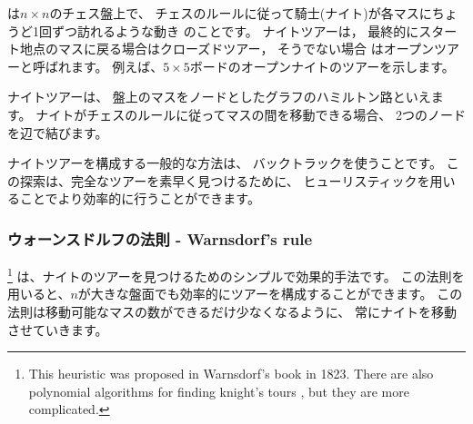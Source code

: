 は$n \times n$のチェス盤上で、
チェスのルールに従って騎士(ナイト)が各マスにちょうど1回ずつ訪れるような動き
のことです。
ナイトツアーは，
最終的にスタート地点のマスに戻る場合はクローズドツアー，
そうでない場合 はオープンツアーと呼ばれます。
例えば、$5 \times 5$ボードのオープンナイトのツアーを示します。

\begin{center}
\end{center}

ナイトツアーは、
盤上のマスをノードとしたグラフのハミルトン路といえます。
ナイトがチェスのルールに従ってマスの間を移動できる場合、
2つのノードを辺で結びます。

ナイトツアーを構成する一般的な方法は、
バックトラックを使うことです。
この探索は、完全なツアーを素早く見つけるために、
ヒューリスティックを用いることでより効率的に行うことができます。

\subsubsection{ウォーンスドルフの法則 - Warnsdorf's rule}


\footnote{This heuristic was proposed
in Warnsdorf's book \cite{war23} in 1823. There are
also polynomial algorithms for finding knight's tours
\cite{par97}, but they are more complicated.}
は、ナイトのツアーを見つけるためのシンプルで効果的手法です。
この法則を用いると、$n$が大きな盤面でも効率的にツアーを構成することができます。
この法則は移動可能なマスの数ができるだけ少なくなるように、
常にナイトを移動させていきます。

